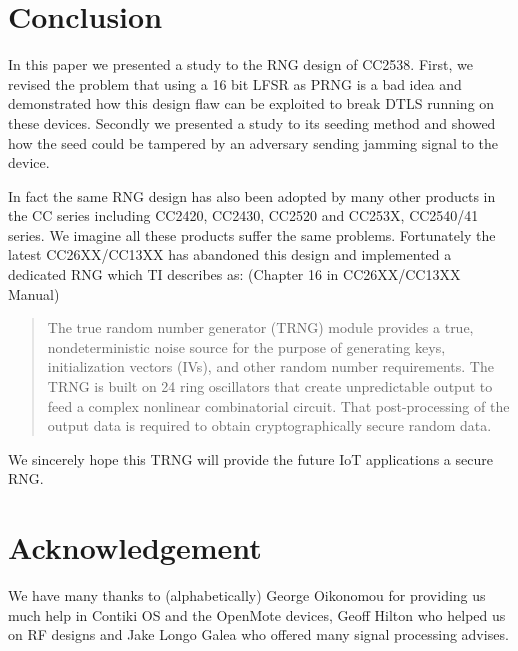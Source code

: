 \section{Conclusion}\label{Conclusion}
In this paper we presented a study to the RNG design of CC2538. First, we revised the problem that using a 16 bit LFSR as PRNG is a bad idea and demonstrated how this design flaw can be exploited to break DTLS running on these devices. Secondly we presented a study to its seeding method and showed how the seed could be tampered by an adversary sending jamming signal to the device.

In fact the same RNG design has also been adopted by many other products in the CC series including CC2420\cite{CC2420Manual}, CC2430\cite{CC2430Manual}, CC2520\cite{CC2520Manual} and CC253X, CC2540/41 series\cite{CC2530Manual}. We imagine all these products suffer the same problems. Fortunately the latest CC26XX/CC13XX\cite{CC26XXManual} has abandoned this design and implemented a dedicated RNG which TI describes as: (Chapter 16 in CC26XX/CC13XX Manual\cite{CC26XXManual})
\begin{quote}
The true random number generator (TRNG) module provides a true, nondeterministic noise source for the
purpose of generating keys, initialization vectors (IVs), and other random number requirements. The
TRNG is built on 24 ring oscillators that create unpredictable output to feed a complex nonlinear
combinatorial circuit. That post-processing of the output data is required to obtain cryptographically secure
random data.
\end{quote}

We sincerely hope this TRNG will provide the future IoT applications a secure RNG.

\section{Acknowledgement}
We have many thanks to (alphabetically) George Oikonomou for providing us much help in Contiki OS and the OpenMote devices, Geoff Hilton who helped us on RF designs and Jake Longo Galea who offered many signal processing advises.